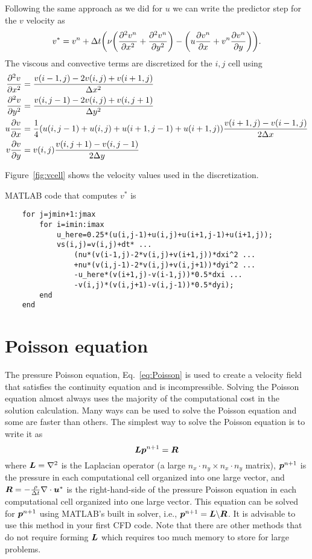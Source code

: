 \documentclass[]{article}
\newcommand{\ie}{i.e.}
\def\bm#1{\mbox{\boldmath{$#1$}}}
\let\originalleft\left
\let\originalright\right
\renewcommand{\left}{\mathopen{}\mathclose\bgroup\originalleft}
\renewcommand{\right}{\aftergroup\egroup\originalright}
\begin{document}
Following the same approach as we did for $u$ we can write the predictor step for the $v$ velocity as
\begin{equation}
  v^*=v^n+\Delta t\left(\nu\left(\frac{\partial^2v^n}{\partial x^2}+\frac{\partial^2v^n}{\partial y^2}\right) 
  -\left(u\frac{\partial v^n}{\partial x}+v^n\frac{\partial v^n}{\partial y}\right)\right).
\end{equation}
The viscous and convective terms are discretized for the $i,j$ cell using
\begin{align}
  \frac{\partial^2 v}{\partial x^2} &= \frac{v(i-1,j)-2v(i,j)+v(i+1,j)}{\Delta x^2}  \\
  \frac{\partial^2 v}{\partial y^2} &= \frac{v(i,j-1)-2v(i,j)+v(i,j+1)}{\Delta y^2} \\
  u\frac{\partial v}{\partial x} &= \frac{1}{4}\left(u(i,j-1)+u(i,j)+u(i+1,j-1)+u(i+1,j)\right)\frac{v(i+1,j)-v(i-1,j)}{2\Delta x}\\
  v\frac{\partial v}{\partial y} &= v(i,j)\frac{v(i,j+1)-v(i,j-1)}{2\Delta y}
\end{align}

Figure~\ref{fig:vcell} shows the velocity values used in the discretization.

MATLAB code that computes $v^*$ is
\begin{lstlisting}
    for j=jmin+1:jmax
        for i=imin:imax
            u_here=0.25*(u(i,j-1)+u(i,j)+u(i+1,j-1)+u(i+1,j));
            vs(i,j)=v(i,j)+dt* ...
                (nu*(v(i-1,j)-2*v(i,j)+v(i+1,j))*dxi^2 ...
                +nu*(v(i,j-1)-2*v(i,j)+v(i,j+1))*dyi^2 ...
                -u_here*(v(i+1,j)-v(i-1,j))*0.5*dxi ...
                -v(i,j)*(v(i,j+1)-v(i,j-1))*0.5*dyi);
        end
    end
\end{lstlisting}

\newpage
\section{Poisson equation}\label{sec:poisson}
The pressure Poisson equation, Eq.~\ref{eq:Poisson} is used to create a velocity field that satisfies the continuity equation and is incompressible.  Solving the Poisson equation almost always uses the majority of the computational cost in the solution calculation.  Many ways can be used to solve the Poisson equation and some are faster than others.  The simplest way to solve the Poisson equation is to write it as 
\begin{equation}\label{eq:PoissonMatrix}
  \bm{L}\bm{p}^{n+1}=\bm{R}
\end{equation}
where $\bm{L}=\nabla^2$ is the Laplacian operator (a large $n_x\cdot n_y \times n_x\cdot n_y$ matrix), $\bm{p}^{n+1}$ is the pressure in each computational cell organized into one large vector, and $\bm{R}=-\frac{\rho}{\Delta t}\nabla\cdot\bm{u}^*$ is the right-hand-side of the pressure Poisson equation in each computational cell organized into one large vector.  This equation can be solved for $\bm{p}^{n+1}$ using MATLAB's built in solver, \ie, $\bm{p}^{n+1}=\bm{L}\backslash \bm{R}$.  It is advisable to use this method in your first CFD code.  Note that there are other methods that do not require forming $\bm{L}$ which requires too much memory to store for large problems.  
\end{document}
